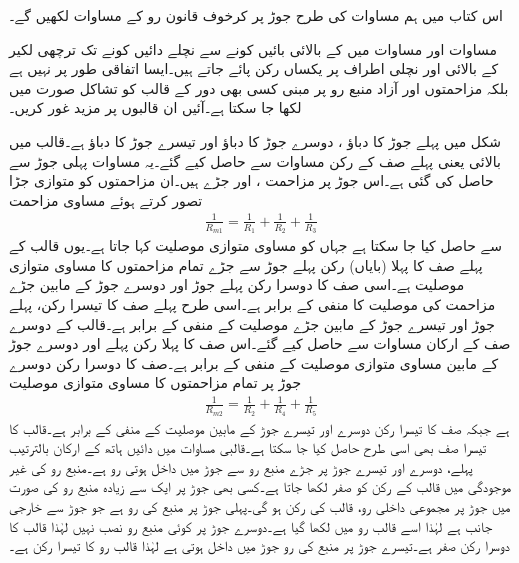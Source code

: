 اس کتاب میں ہم مساوات  کی طرح جوڑ پر کرخوف قانون رو کے مساوات لکھیں گے۔

مساوات  اور مساوات  میں    کے بالائی بائیں کونے سے نچلے دائیں کونے تک ترچھی لکیر کے بالائی اور نچلی اطراف پر یکساں رکن پائے جاتے ہیں۔ایسا اتفاقی طور پر نہیں ہے  بلکہ مزاحمتوں اور آزاد منبع رو پر مبنی کسی بھی دور کے  قالب کو تشاکل صورت میں لکھا جا سکتا ہے۔آئیں ان قالبوں پر مزید غور کریں۔

شکل  میں پہلے جوڑ کا دباؤ ، دوسرے  جوڑ کا دباؤ  اور تیسرے جوڑ کا دباؤ  ہے۔قالب میں بالائی یعنی پہلے صف کے رکن مساوات  سے حاصل کیے گئے۔یہ مساوات پہلی جوڑ سے حاصل کی گئی ہے۔اس جوڑ پر مزاحمت ،  اور  جڑے ہیں۔ان مزاحمتوں کو متوازی جڑا تصور کرتے ہوئے مساوی مزاحمت 
\begin{align*}
\frac{1}{R_{m1}}=\frac{1}{R_1}+\frac{1}{R_2}+\frac{1}{R_3}
\end{align*}
سے حاصل کیا جا سکتا ہے جہاں  کو مساوی متوازی موصلیت  کہا جاتا ہے۔یوں  قالب کے پہلے صف کا پہلا (بایاں) رکن  پہلے جوڑ سے  جڑے تمام مزاحمتوں کا مساوی متوازی موصلیت   ہے۔اسی صف کا دوسرا رکن  پہلے جوڑ اور دوسرے جوڑ کے مابین جڑے مزاحمت کی موصلیت کا منفی  کے برابر ہے۔اسی طرح پہلے صف کا تیسرا رکن، پہلے جوڑ اور تیسرے جوڑ کے مابین جڑے موصلیت کے منفی  کے برابر ہے۔قالب کے دوسرے صف کے ارکان مساوات  سے حاصل کیے گئے۔اس صف کا پہلا رکن پہلے اور دوسرے جوڑ کے مابین مساوی متوازی موصلیت کے منفی  کے برابر ہے۔صف کا دوسرا رکن دوسرے جوڑ پر تمام مزاحمتوں کا مساوی متوازی موصلیت 
\begin{align*}
\frac{1}{R_{m2}}=\frac{1}{R_2}+\frac{1}{R_4}+\frac{1}{R_5}
\end{align*}
ہے جبکہ صف کا تیسرا رکن دوسرے اور تیسرے جوڑ کے مابین موصلیت کے منفی  کے برابر ہے۔قالب کا تیسرا صف بھی اسی طرح حاصل کیا جا سکتا ہے۔قالبی مساوات میں دائیں ہاتھ  کے ارکان بالترتیب پہلے، دوسرے اور تیسرے جوڑ پر جڑے منبع رو سے جوڑ میں داخل ہوتی رو ہے۔منبع رو کی غیر موجودگی میں قالب کے رکن کو صفر لکھا جاتا ہے۔کسی بھی جوڑ پر ایک سے زیادہ منبع رو کی صورت میں جوڑ پر مجموعی داخلی رو، قالب کی رکن ہو گی۔پہلی جوڑ پر منبع کی رو  ہے جو جوڑ سے خارجی جانب ہے لہٰذا اسے قالب رو میں  لکھا گیا ہے۔دوسرے جوڑ پر کوئی منبع رو نصب نہیں لہٰذا قالب کا دوسرا رکن صفر ہے۔تیسرے جوڑ پر منبع  کی رو جوڑ میں داخل ہوتی ہے لہٰذا قالب رو کا تیسرا رکن  ہے۔ 

